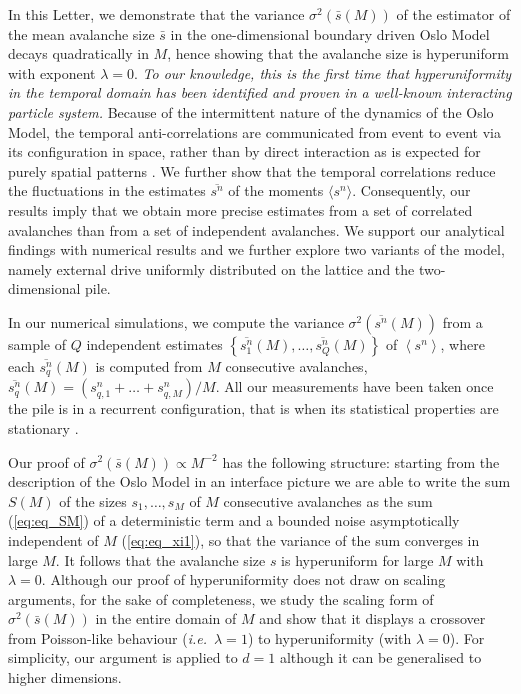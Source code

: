 \documentclass[doublecol]{epl2}
\newcommand{\ave}[1]{\left\langle{#1}\right\rangle}
\newcommand{\latin}[1]{{\it #1}}
\newcommand{\eref}[1]{(\ref{eq:#1})}
\newcommand{\wasrevised}[1]{#1}
\begin{document}
In this Letter, we  \wasrevised{demonstrate} that the variance $\sigma^2\left(\bar{s}(M)\right)$ of the estimator of the mean avalanche size $\bar{s}$ in the one-dimensional boundary driven Oslo Model decays quadratically in $M$, hence showing that the avalanche size is hyperuniform with exponent $\lambda=0$.  \emph{To our knowledge, this is the first time that hyperuniformity in the temporal domain has been identified and proven in a well-known interacting particle system.}  \wasrevised{Because of the intermittent nature of the dynamics of the Oslo Model, the temporal anti-correlations are communicated from event to event via its configuration in space, rather than by direct interaction as is expected for purely spatial patterns \cite{jiao2014avian}}. We further show that the temporal correlations reduce the fluctuations in the estimates $\overline{s^n}$ of the moments $\langle s^n\rangle$. Consequently, our results imply that we obtain more precise estimates from a set of correlated avalanches than from a set of independent avalanches.
 We support our analytical findings with numerical results and we further explore two variants of the model, namely external drive uniformly distributed on the lattice and the two-dimensional pile.
 
 In our numerical simulations, we compute the variance $\sigma^2\left(\overline{s^n}(M)\right)$ from a sample of $Q$ independent estimates $\left\{\overline{s_1^n}(M), \ldots, \overline{s_Q^n}(M)\right\}$ of $\ave{s^n}$, where each $\overline{s_q^n}(M)$ is computed from $M$ consecutive avalanches, $\overline{s_q^n}(M) = \left(s_{q,1}^n+\ldots+s_{q,M}^n\right)/M$. All our measurements have been taken once the pile is in a recurrent configuration, that is when its statistical properties are stationary \cite{dhar2004steady,paczuski1996avalanche,corral2004calculation,PhysRevE.78.041102,PhysRevLett.77.111,pruessner2012self}.
 
 Our proof of $\sigma^2\left(\bar{s}(M)\right)\propto M^{-2}$ has the following structure: starting from the description of the Oslo Model \cite{ChristensenETAL:1996} in an interface picture \cite{PhysRevLett.77.111, pruessner2003oslo} we are able to write the sum $S(M)$ of the sizes $s_1,\ldots,s_M$ of $M$ consecutive avalanches as the sum \eref{eq_SM} of a deterministic term and a bounded noise asymptotically independent of $M$ \eref{eq_xi1}, so that the variance of the sum converges in large $M$. It follows that the  avalanche size ${s}$ is hyperuniform for large $M$ with $\lambda=0$. 
 Although our proof of hyperuniformity does not draw on scaling arguments,
for the sake of completeness, we study the scaling form of  $\sigma^2\left
(\bar{s}(M)\right)$ in the entire domain of $M$ and show that it displays
a crossover
from Poisson-like behaviour (\latin{i.e.}~$\lambda=1$) to hyperuniformity (with $\lambda=0$).
For simplicity, our argument is applied to $d=1$ although it can be generalised to higher dimensions.
 
\end{document}
